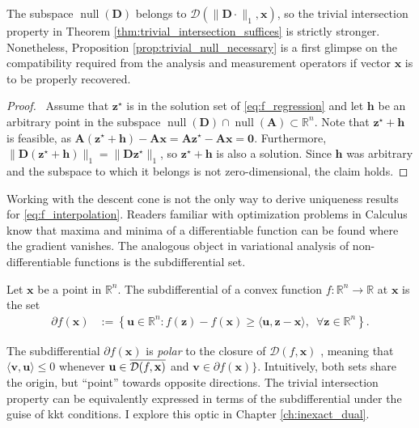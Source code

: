 The subspace $\operatorname{null} \left ( \mathbf{D} \right )$ belongs to $\mathcal{D}(\|\mathbf{D} \cdot \|_1, \mathbf{x})$, so the trivial intersection property in Theorem \ref{thm:trivial_intersection_suffices} is strictly stronger. Nonetheless, Proposition \ref{prop:trivial_null_necessary} is a first glimpse on the compatibility required from the analysis and measurement operators if vector $\mathbf{x}$ is to be properly recovered.

\begin{proof}
    \pf\ Assume that $\mathbf{z}^\star$ is in the solution set of \eqref{eq:f_regression} and let $\mathbf{h}$ be an arbitrary point in the subspace $\operatorname{null} \left ( \mathbf{D} \right ) \cap \operatorname{null} \left ( \mathbf{A} \right ) \subset \mathbb{R}^{n}$. Note that $\mathbf{z}^\star + \mathbf{h}$ is feasible, as $\mathbf{A}(\mathbf{z}^\star + \mathbf{h}) - \mathbf{Ax} = \mathbf{A}\mathbf{z}^\star - \mathbf{Ax} = \mathbf{0}$. Furthermore, $\|\mathbf{D(z^\star + h)}\|_1 = \|\mathbf{Dz^\star}\|_1$, so $\mathbf{z}^\star + \mathbf{h}$ is also a solution. Since $\mathbf{h}$ was arbitrary and the subspace to which it belongs is not zero-dimensional, the claim holds.\hfill\qedsymbol
\end{proof}

Working with the descent cone is not the only way to derive uniqueness results for \eqref{eq:f_interpolation}. Readers familiar with optimization problems in Calculus know that maxima and minima of a differentiable function can be found where the gradient vanishes. The analogous object in variational analysis of non-differentiable functions is the subdifferential set.

\begin{definition}[Subdifferential]
    Let $\mathbf{x}$ be a point in $\mathbb{R}^{n}$. The subdifferential of a convex function $f: \mathbb{R}^{n} \to \mathbb{R}$ at $\mathbf{x}$ is the set
    \begin{align}
        \partial f(\mathbf{x}) & := \left \{ \mathbf{u} \in \mathbb{R}^{n} : f(\mathbf{z}) - f(\mathbf{x}) \geq \langle \mathbf{u}, \mathbf{z} - \mathbf{x}\rangle, \enspace \forall \mathbf{z} \in \mathbb{R}^{n}\right \}.
    \end{align}
\end{definition}

The subdifferential $\partial f(\mathbf{x})$ is \emph{polar} to the closure of $\mathcal{D}(f, \mathbf{x})$ \cite[Thm. 23.7]{rockafellar1970}, meaning that $\langle \mathbf{v}, \mathbf{u} \rangle \leq 0$ whenever $\mathbf{u} \in \mathop{\overline{\mathcal{D}(f, \mathbf{x})}}$ and $\mathbf{v} \in \partial f(\mathbf{x})\}$. Intuitively, both sets share the origin, but ``point'' towards opposite directions. The trivial intersection property can be equivalently expressed in terms of the subdifferential under the guise of \acrfull{kkt} conditions. I explore this optic in Chapter \ref{ch:inexact_dual}.

